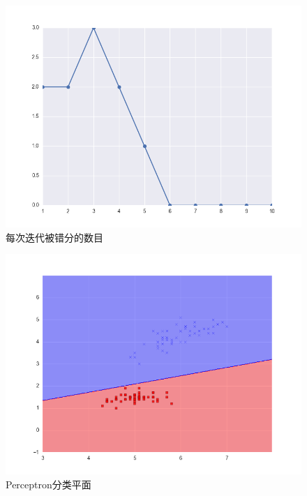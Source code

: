\documentclass{ctexart}
\begin{document}
\begin{figure}[H]
\begin{center}
\includegraphics[width=1\textwidth]{fig/errors.png} %
\caption{每次迭代被错分的数目}
\end{center}
\end{figure}


\begin{figure}[H]
\begin{center}
\includegraphics[width=1\textwidth]{fig/decision.png} %
\caption{Perceptron分类平面}
\end{center}
\end{figure}
\end{document}
